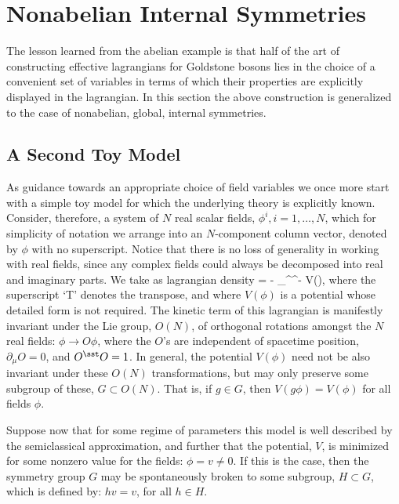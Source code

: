 \documentclass[12pt]{report}
\begin{document}
\section{Nonabelian Internal Symmetries}

The lesson learned from the abelian example is that half of
the art of constructing effective lagrangians for Goldstone
bosons lies in the choice of a convenient set of variables
in terms of which their properties are explicitly displayed
in the lagrangian. In this section the above construction is
generalized to the case of nonabelian, global, internal
symmetries.

\subsection{A Second Toy Model}

As guidance towards an appropriate choice of field
variables we once more start with a simple toy model for
which the underlying theory is explicitly known. Consider,
therefore, a system of $N$ real scalar fields, $\phi^i, i =
1,\dots,N$, which for simplicity of notation we arrange into
an $N$-component column vector, denoted by $\phi$ with no
superscript. Notice that there is no loss of generality in
working with real fields, since any complex fields could
always be decomposed into  real and imaginary parts. We
take as lagrangian density
%
\eq
\label{nonabeltm}
\Scl = - \hf \; \partial_\mu \phi^\sst \partial^\mu \phi -
V(\phi),
\eeq
%
where the superscript `T' denotes the transpose, and where
$V(\phi)$ is a potential whose detailed form is not
required. The kinetic term of this lagrangian is manifestly
invariant under the Lie group, $O(N)$, of orthogonal
rotations amongst the $N$ real fields: $\phi \to O \phi$,
where the $O$'s are independent of spacetime position,
$\partial_\mu O  =0$, and $O^\sst O = 1$. In general, the
potential $V(\phi)$ need not be also invariant under these
$O(N)$ transformations, but may only preserve some subgroup
of these, $G \subset O(N)$. That is, if $g \in G$, then $V(g
\phi) = V(\phi)$ for all fields $\phi$.

Suppose now that for some regime of parameters this model
is well described by the semiclassical approximation, and
further that the potential, $V$, is minimized for some
nonzero value for the fields: $\phi = v \neq 0$. If this is
the case, then the symmetry group $G$ may be spontaneously
broken to some subgroup, $H 
\subset G$, which is defined by: $h v = v$, for all $h \in
H$.
\end{document}
